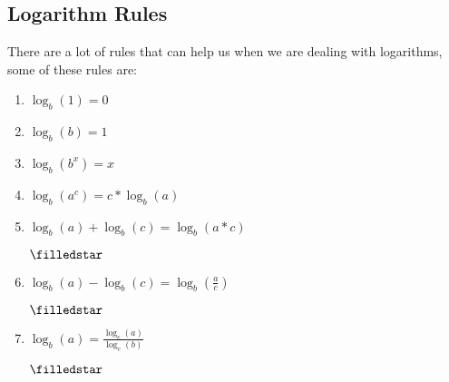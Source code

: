 \documentclass[a4paper, 15pt]{article}
\newcommand{\importantStar}{
	\begin{Large}
		\textcolor{red}{$\filledstar$}
	\end{Large}
}
\begin{document}
		\subsection{Logarithm Rules}
			\noindent There are a lot of rules that can help us when we are dealing with logarithms, some of these rules are:
			\begin{enumerate}
				\item $\log_{b}(1) = 0$
				\item $\log_{b}(b) = 1$
				\item $\log_{b}(b^x) = x$
				\item $\log_{b}(a^c) = c*\log_{b}(a)$
				\item $\log_{b}(a) + \log_{b}(c) = \log_{b}(a*c)$ \hspace{4mm} \importantStar
				\item $\log_{b}(a) - \log_{b}(c) = \log_{b}(\frac{a}{c})$ \hspace{4mm} \importantStar
				\item $\log_{b}(a) = \frac{\log_{c}(a)}{\log_{c}(b)}$ \hspace{4mm} \importantStar
			\end{enumerate}
\end{document}
